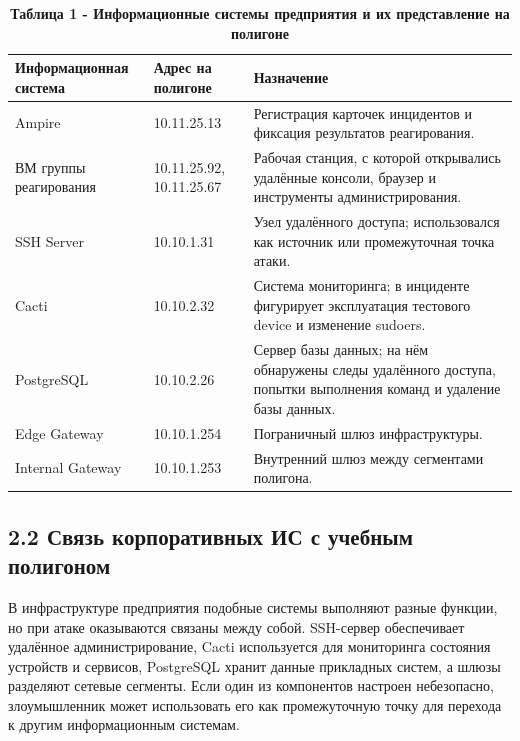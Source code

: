 \documentclass[14pt]{extarticle}
\begin{document}
\begin{table}[H]
\caption*{\hfill \textbf{Таблица 1 - Информационные системы предприятия и их представление на полигоне}}
\begin{tabularx}{\textwidth}{|p{4.2cm}|p{3.2cm}|Y|}
\hline
\textbf{Информационная система} & \textbf{Адрес на полигоне} & \textbf{Назначение} \\
\hline
Ampire & 10.11.25.13 & Регистрация карточек инцидентов и фиксация результатов реагирования. \\
\hline
ВМ группы реагирования & 10.11.25.92, 10.11.25.67 & Рабочая станция, с которой открывались удалённые консоли, браузер и инструменты администрирования. \\
\hline
SSH Server & 10.10.1.31 & Узел удалённого доступа; использовался как источник или промежуточная точка атаки. \\
\hline
Cacti & 10.10.2.32 & Система мониторинга; в инциденте фигурирует эксплуатация тестового device и изменение sudoers. \\
\hline
PostgreSQL & 10.10.2.26 & Сервер базы данных; на нём обнаружены следы удалённого доступа, попытки выполнения команд и удаление базы данных. \\
\hline
Edge Gateway & 10.10.1.254 & Пограничный шлюз инфраструктуры. \\
\hline
Internal Gateway & 10.10.1.253 & Внутренний шлюз между сегментами полигона. \\
\hline
\end{tabularx}
\end{table}

\subsection*{2.2 Связь корпоративных ИС с учебным полигоном}

В инфраструктуре предприятия подобные системы выполняют разные функции, но при атаке оказываются связаны между собой. SSH-сервер обеспечивает удалённое администрирование, Cacti используется для мониторинга состояния устройств и сервисов, PostgreSQL хранит данные прикладных систем, а шлюзы разделяют сетевые сегменты. Если один из компонентов настроен небезопасно, злоумышленник может использовать его как промежуточную точку для перехода к другим информационным системам.
\end{document}
